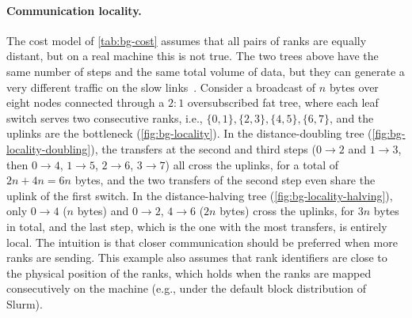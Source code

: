 \paragraph{Communication locality.}
The cost model of \cref{tab:bg-cost} assumes that all pairs of ranks are equally distant, but on a real machine this is not true.
The two trees above have the same number of steps and the same total volume of data, but they can generate a very different traffic on the slow links~\cite{desensi2025bine}.
Consider a broadcast of $n$ bytes over eight nodes connected through a $2{:}1$ oversubscribed fat tree, where each leaf switch serves two consecutive ranks, i.e., $\{0,1\},\{2,3\},\{4,5\},\{6,7\}$, and the uplinks are the bottleneck (\cref{fig:bg-locality}).
In the distance-doubling tree (\cref{fig:bg-locality-doubling}), the transfers at the second and third steps ($0\to2$ and $1\to3$, then $0\to4$, $1\to5$, $2\to6$, $3\to7$) all cross the uplinks, for a total of $2n+4n=6n$ bytes, and the two transfers of the second step even share the uplink of the first switch.
In the distance-halving tree (\cref{fig:bg-locality-halving}), only $0\to4$ ($n$ bytes) and $0\to2$, $4\to6$ ($2n$ bytes) cross the uplinks, for $3n$ bytes in total, and the last step, which is the one with the most transfers, is entirely local.
The intuition is that closer communication should be preferred when more ranks are sending.
This example also assumes that rank identifiers are close to the physical position of the ranks, which holds when the ranks are mapped consecutively on the machine (e.g., under the default block distribution of Slurm).

